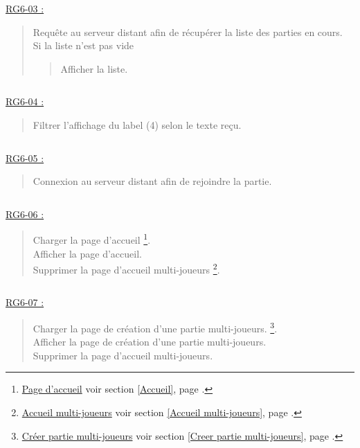 \documentclass{report}
\begin{document}
			$\,$	
				
			\underline{RG6-03 :}
				\begin{quote}
					Requête au serveur distant afin de récupérer la liste des parties en cours.\\
					Si la liste n'est pas vide
					\begin{quote}
						Afficher la liste.
					\end{quote}								
				\end{quote}

			$\,$

			\underline{RG6-04 :}
				\begin{quote}
					Filtrer l'affichage du label (4) selon le texte reçu.
				\end{quote}

			$\,$
				
			\underline{RG6-05 :}
				\begin{quote}
					Connexion au serveur distant afin de rejoindre la partie.
				\end{quote}

			$\,$
				
			\underline{RG6-06 :}
				\begin{quote}
					Charger la page d'accueil%
						\footnote[1]{
							\hyperlink{Page d'accueil}{Page d'accueil}
							\og voir section \ref{Accueil}, page \pageref{Accueil}.\fg
						}.\\
					Afficher la page d'accueil\footnotemark[1].\\
					Supprimer la page d'accueil multi-joueurs%
						\footnote[2]{
							\hyperlink{Accueil multi-joueurs}{Accueil multi-joueurs}
							\og voir section \ref{Accueil multi-joueurs}, page \pageref{Accueil multi-joueurs}.\fg
						}.
				\end{quote}

			$\,$

			\underline{RG6-07 :}
				\begin{quote}
					Charger la page de création d'une partie multi-joueurs.%
						\footnote[3]{
							\hyperlink{Creer partie multi-joueurs}{Créer partie multi-joueurs}
							\og voir section \ref{Creer partie multi-joueurs}, page \pageref{Creer partie multi-joueurs}.\fg
						}.\\
					Afficher la page de création d'une partie multi-joueurs\footnotemark[3].\\
					Supprimer la page d'accueil multi-joueurs\footnotemark[2].
				\end{quote}
\end{document}
